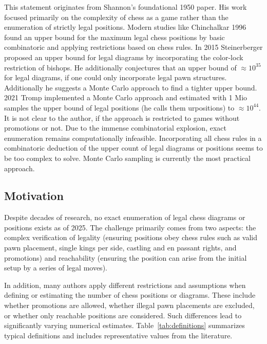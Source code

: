 \documentclass[12pt]{article}
\begin{document}
This statement originates from Shannon’s foundational 1950 paper. His work focused primarily on the complexity of chess as a game rather than the enumeration of strictly legal positions. 
Modern studies like Chinchalkar 1996 \cite{chinchalkar1996} found an upper bound for the maximum legal chess positions by basic combinatoric and applying restrictions based on chess rules. In 2015 Steinerberger \cite{steinerberger2015} proposed an upper bound for legal diagrams by incorporating the color-lock restriction of bishops. He additionally conjectures that an upper bound of $\approx10^{35}$ for legal diagrams, if one could only incorporate legal pawn structures. Additionally he suggests a Monte Carlo approach to find a tighter upper bound.
2021 Tromp \cite{tromp2021b} implemented a Monte Carlo approach and estimated with 1 Mio samples the upper bound of legal positions (he calls them urpositions) to $\approx10^{44}$. It is not clear to the author, if the approach is restricted to games without promotions or not. 
Due to the immense combinatorial explosion, exact enumeration remains computationally infeasible. Incorporating all chess rules in a combinatoric deduction of the upper count of legal diagrams or positions seems to be too complex to solve. Monte Carlo sampling is currently the most practical approach.

\subsection{Motivation}

Despite decades of research, no exact enumeration of legal chess diagrams or positions exists as of 2025. 
The challenge primarily comes from two aspects: the complex verification of legality 
(ensuring positions obey chess rules such as valid pawn placement, single kings per side, 
castling and en passant rights, and promotions) and reachability 
(ensuring the position can arise from the initial setup by a series of legal moves). 

In addition, many authors apply different restrictions and assumptions when defining or estimating 
the number of chess positions or diagrams. These include whether promotions are allowed, whether illegal pawn 
placements are excluded, or whether only reachable positions are considered. Such differences lead 
to significantly varying numerical estimates. Table~\ref{tab:definitions} summarizes typical definitions 
and includes representative values from the literature.
\end{document}
